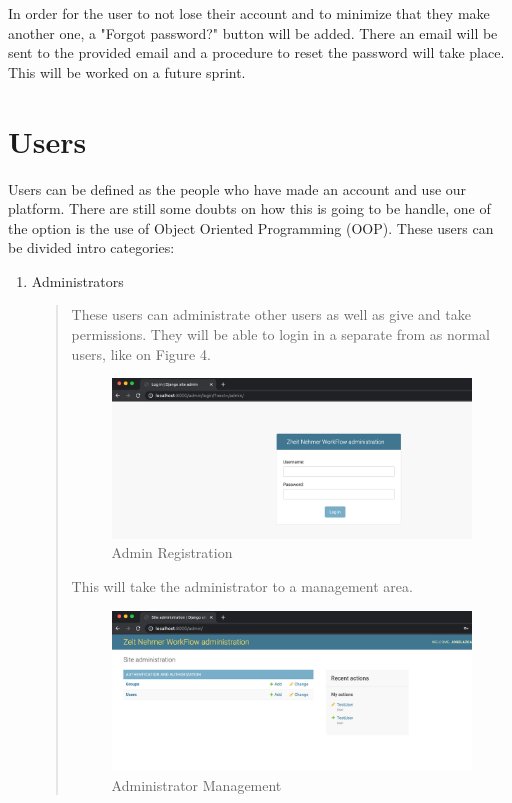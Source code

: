 \documentclass{article}
\begin{document}
  In order for the user to not lose their account and to minimize that they make another one, a "Forgot password?" button will be added. There an email will be sent to the provided email and a procedure to reset the password will take place. This will be worked on a future sprint.


\section{Users}
  Users can be defined as the people who have made an account and use our platform. There are still some doubts on how this is going to be handle, one of the option is the use of Object Oriented Programming (OOP). These users can be divided intro categories:
  \begin{enumerate}
    \item Administrators
    \begin{quote}
        These users can administrate other users as well as give and take permissions. They will be able to login in a separate from as normal users, like on Figure 4.
        \begin{figure}[h!]
            \centering
            \includegraphics[scale=0.75]{Images/adminLogin.png}
            \caption{Admin Registration}
            \label{fig:figure 4}
        \end{figure}

        \vspace{160}

        This will take the administrator to a management area.

        \begin{figure}[h!]
            \centering
            \includegraphics[scale=0.75]{Images/adminManage.png}
            \caption{Administrator Management}
            \label{fig:figure 5}
        \end{figure}




\end{quote}
\end{enumerate}
\end{document}
